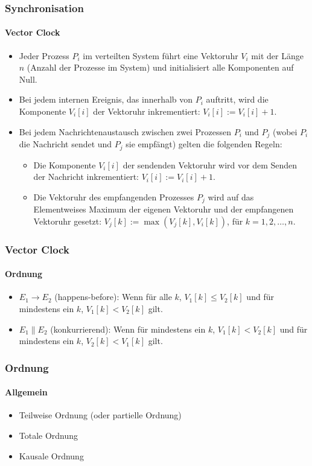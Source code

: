 \begin{frame}
  \frametitle{Synchronisation}
  \framesubtitle{Vector Clock}
  \begin{itemize}
  \item Jeder Prozess $P_i$ im verteilten System führt eine Vektoruhr $V_i$ mit der Länge $n$ (Anzahl der Prozesse im System) und initialisiert alle Komponenten auf Null.
  \item Bei jedem internen Ereignis, das innerhalb von $P_i$ auftritt, wird die Komponente $V_i[i]$ der Vektoruhr inkrementiert: $V_i[i] := V_i[i] + 1$.
  \item Bei jedem Nachrichtenaustausch zwischen zwei Prozessen $P_i$ und $P_j$ (wobei $P_i$ die Nachricht sendet und $P_j$ sie empfängt) gelten die folgenden Regeln:
  \begin{itemize}
  \item Die Komponente $V_i[i]$ der sendenden Vektoruhr wird vor dem Senden der Nachricht inkrementiert: $V_i[i] := V_i[i] + 1$.
  \item Die Vektoruhr des empfangenden Prozesses $P_j$ wird auf das Elementweises Maximum der eigenen Vektoruhr und der empfangenen Vektoruhr gesetzt: $V_j[k] := \max(V_j[k], V_i[k])$, für $k = 1, 2, \dots, n$.
  \end{itemize}
  \end{itemize}
\end{frame}

\begin{frame}
  \frametitle{Vector Clock}
  \framesubtitle{Ordnung}
  \begin{itemize}
  \item $E_1 \to E_2$ (happens-before): Wenn für alle $k$, $V_1[k] \leq V_2[k]$ und für mindestens ein $k$, $V_1[k] < V_2[k]$ gilt.
  \item $E_1 \parallel E_2$ (konkurrierend): Wenn für mindestens ein $k$, $V_1[k] < V_2[k]$ und für mindestens ein $k$, $V_2[k] < V_1[k]$ gilt.
  \end{itemize}
\end{frame}

\begin{frame}
  \frametitle{Ordnung}
  \framesubtitle{Allgemein}
  \begin{itemize}
    \item Teilweise Ordnung (oder partielle Ordnung) 
    \item Totale Ordnung 
    \item Kausale Ordnung 
  \end{itemize}
\end{frame}

